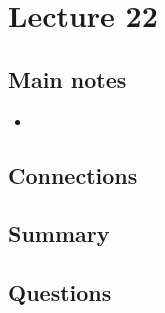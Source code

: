 \section{Lecture 22}

\subsection{Main notes}


\begin{itemize}
	\item
\end{itemize}


\subsection{Connections}


\subsection{Summary}


\subsection{Questions}
